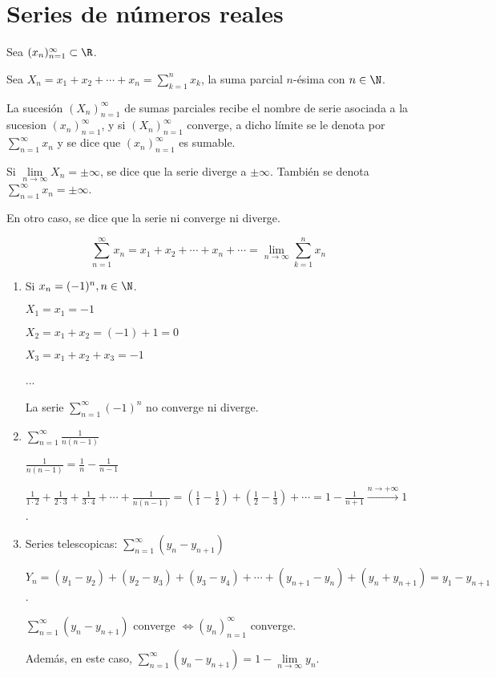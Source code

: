 \section{Series de números reales}
\begin{definition}[Serie]
	Sea \((x_n)^{\infty}_{n=1} \subset \R \). 
	
	Sea \(X_n = x_1 + x_2 + \cdots + x_n = \sum_{k =1}^{n } x_k \), la suma parcial \(n\)-ésima con \(n \in \N \).
	
	La sucesión \((X_n)^{\infty}_{n=1} \) de sumas parciales recibe el nombre de serie asociada a la sucesion \((x_n)^{\infty}_{n=1} \), y si \((X_n)^{\infty}_{n=1} \) converge, a dicho límite se le denota por \(\sum_{n =1}^{\infty} x_n \) y se dice que \((x_n)^{\infty}_{n=1} \) es sumable. 
	
	Si \(\lim\limits_{n \to \infty} X_n = \pm\infty \), se dice que la serie diverge a \(\pm\infty \). También se denota \(\sum_{n =1}^{\infty} x_n = \pm \infty \). 
	
	En otro caso, se dice que la serie ni converge ni diverge.
\end{definition}
\begin{remark}
	\[
		\sum_{n =1}^{\infty} x_n = x_1 + x_2 + \cdots + x_n + \cdots = \lim\limits_{n \to \infty} \sum_{k =1}^{n } x_n
	\]
\end{remark}
\begin{example}
	\begin{enumerate}
		\item Si \(x_n = (-1)^{n }, n \in \N \).
		      
		      \(X_1 = x_1 = -1 \)
		      
		      \(X_2 = x_1 + x_2 = (-1) + 1 = 0 \)
		      
		      \(X_3 = x_1 + x_2 + x_3 = -1 \)
		      
		      ...
		      
		      La serie \(\sum_{n =1}^{\infty} (-1)^{n} \) no converge ni diverge.
		\item \(\sum_{n =1}^{\infty} \frac{1 }{n(n-1)}\)
		      
		      \(\frac{1}{n(n-1)} = \frac{1}{n } - \frac{1}{n-1 }\)
		      
		      \(\frac{1}{1 \cdot 2 } + \frac{1}{2 \cdot 3 } + \frac{1}{3 \cdot 4 } + \cdots + \frac{1}{n(n-1)} = (\frac{1}{1} - \frac{1}{2}) + ( \frac{1}{2} - \frac{1}{3}) + \cdots = 1 - \frac{1}{n + 1} \overset{n \to +\infty}{\longrightarrow} 1\).
		\item Series telescopicas: \(\sum_{n =1}^{\infty} (y_n - y_{n+1})\)
		      
		      \(Y_n = (y_1 - y_2) + (y_2 - y_3) + (y_3 - y_4) + \cdots + (y_{n+1} - y_n) + (y_n + y_{n+1}) = y_1 - y_{n+1}\).
		      
		      \(\sum_{n =1}^{\infty} (y_n - y_{n+1})\) converge \(\iff (y_n)^{\infty}_{n=1} \) converge.
		      
		      Además, en este caso, \(\sum_{n =1}^{\infty} (y_n - y_{n+1}) = 1 - \lim\limits_{n \to \infty} y_n \).
	\end{enumerate}
\end{example}
